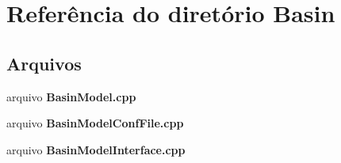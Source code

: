 \section{Referência do diretório Basin}
\label{dir_ee6ee18133466c1e137fa044d9972db2}
\subsection*{Arquivos}
\begin{DoxyCompactItemize}
\item 
arquivo {\bf Basin\+Model.\+cpp}
\item 
arquivo {\bf Basin\+Model\+Conf\+File.\+cpp}
\item 
arquivo {\bf Basin\+Model\+Interface.\+cpp}
\end{DoxyCompactItemize}
